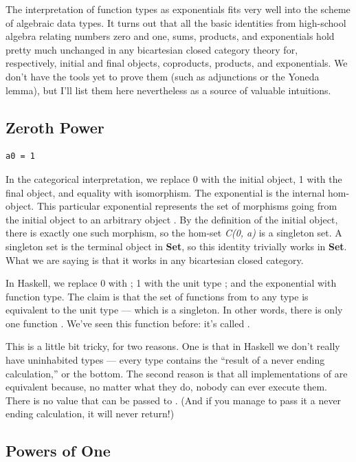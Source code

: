The interpretation of function types as exponentials fits very well into
the scheme of algebraic data types. It turns out that all the basic
identities from high-school algebra relating numbers zero and one, sums,
products, and exponentials hold pretty much unchanged in any bicartesian
closed category theory for, respectively, initial and final objects,
coproducts, products, and exponentials. We don't have the tools yet to
prove them (such as adjunctions or the Yoneda lemma), but I'll list them
here nevertheless as a source of valuable intuitions.

\subsection{Zeroth Power}\label{zeroth-power}

\begin{verbatim}
a0 = 1
\end{verbatim}

In the categorical interpretation, we replace 0 with the initial object,
1 with the final object, and equality with isomorphism. The exponential
is the internal hom-object. This particular exponential represents the
set of morphisms going from the initial object to an arbitrary object
. By the definition of the initial object, there is exactly
one such morphism, so the hom-set \emph{C(0, a)} is a singleton set. A
singleton set is the terminal object in \textbf{Set}, so this identity
trivially works in \textbf{Set}. What we are saying is that it works in
any bicartesian closed category.

In Haskell, we replace 0 with ; 1 with the unit type
\code{()}; and the exponential with function type. The claim is that
the set of functions from  to any type  is
equivalent to the unit type --- which is a singleton. In other words,
there is only one function . We've seen
this function before: it's called .

This is a little bit tricky, for two reasons. One is that in Haskell we
don't really have uninhabited types --- every type contains the ``result
of a never ending calculation,'' or the bottom. The second reason is
that all implementations of  are equivalent because, no
matter what they do, nobody can ever execute them. There is no value
that can be passed to . (And if you manage to pass it a
never ending calculation, it will never return!)

\subsection{Powers of One}\label{powers-of-one}

